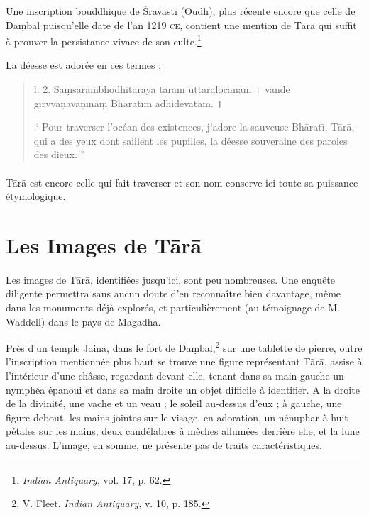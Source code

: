 \documentclass[a4paper, 11pt, oneside, french]{article}
\begin{document}
Une inscription bouddhique de \'{S}r\={a}vast\={\i} (Oudh), plus récente encore que celle de Da\d{m}bal puisqu'elle date de l'an 1219 \textsc{ce}, contient une mention de T\={a}r\={a} qui suffit à prouver la persistance vivace de son culte.\footnote{\emph{Indian Antiquary}, vol. 17, p. 62.}

La déesse est adorée en ces termes :
\begin{quotation}
l. 2. Sa\d{m}s\={a}r\={a}mbhodhit\={a}r\={a}ya t\={a}r\={a}m utt\={a}ralocan\={a}m \texthindi{।} vande g\={\i}rvv\={a}\d{n}av\={a}\d{n}\={\i}n\={a}\d{m} Bh\={a}rat\={\i}m adhidevat\={a}m. \texthindi{॥}

\bigskip

`` Pour traverser l'océan des existences, j'adore la sauveuse Bh\={a}rat\={\i}, T\={a}r\={a}, qui a des yeux dont saillent les pupilles, la déesse souveraine des paroles des dieux. ''
\end{quotation}
\paragraph{}
T\={a}r\={a} est encore celle qui fait traverser et son nom conserve ici toute sa puissance étymologique.
\clearpage
\section{Les Images de T\={a}r\={a}}
\paragraph{}
Les images de T\={a}r\={a}, identifiées jusqu'ici, sont peu nombreuses. Une enquête diligente permettra sans aucun doute d'en reconnaître bien davantage, même dans les monuments déjà explorés, et particulièrement (au témoignage de M. Waddell) dans le pays de Magadha.

Près d'un temple Jaina, dans le fort de Da\d{m}bal,\footnote{V. Fleet. \emph{Indian Antiquary}, v. 10, p. 185.} sur une tablette de pierre, outre l'inscription mentionnée plus haut se trouve une figure représentant T\={a}r\={a}, assise à l'intérieur d'une châsse, regardant devant elle, tenant dans sa main gauche un nymphéa épanoui et dans sa main droite un objet difficile à identifier. A la droite de la divinité, une vache et un veau ; le soleil au-dessus d'eux ; à gauche, une figure debout, les mains jointes sur le visage, en adoration, un nénuphar à huit pétales sur les mains, deux candélabres à mèches allumées derrière elle, et la lune au-dessus. L'image, en somme, ne présente pas de traits caractéristiques.
\end{document}
